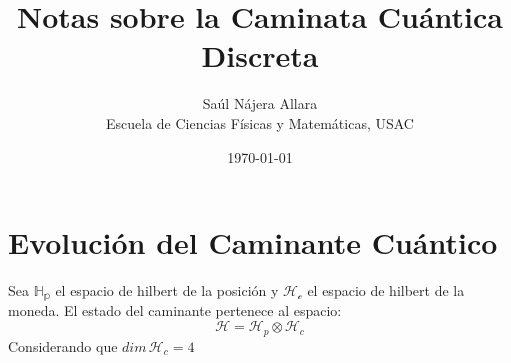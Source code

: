 \documentclass[12pt]{article}
\title{Notas sobre la Caminata Cuántica Discreta}
\author{Saúl Nájera Allara \\ \small Escuela de Ciencias Físicas y Matemáticas, USAC}
\date{\today}
\begin{document}
\maketitle

\section*{Evolución del Caminante Cuántico}

Sea $\mathbb{H_p}$ el espacio de hilbert de la posición y $\mathcal{H_c}$ el espacio de hilbert de la moneda. El estado del caminante 
pertenece al espacio:
\begin{equation}
\mathcal{H}=\mathcal{H}_p \otimes \mathcal{H}_c
\end{equation}
Considerando que $dim\, \mathcal{H}_c=4$
\end{document}
